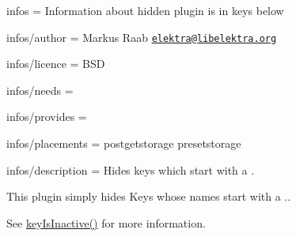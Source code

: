 
\begin{DoxyItemize}
\item infos = Information about hidden plugin is in keys below
\item infos/author = Markus Raab \href{mailto:elektra@libelektra.org}{\tt elektra@libelektra.\+org}
\item infos/licence = B\+S\+D
\item infos/needs =
\item infos/provides =
\item infos/placements = postgetstorage presetstorage
\item infos/description = Hides keys which start with a .
\end{DoxyItemize}

This plugin simply hides Keys whose names start with a {\ttfamily .}.

See \hyperlink{group__keytest_gaa25f699f592031c1a0abc1504d14e13e}{key\+Is\+Inactive()} for more information. 